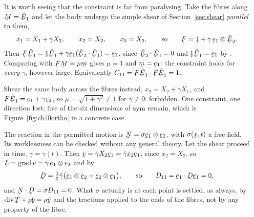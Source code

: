 \begin{example}
\label{ex:ch10fibre}
It is worth seeing that the constraint is far from paralysing. Take the
fibres along $\bM=\hbE_{1}$ and let the body undergo the simple shear of
Section~\ref{sec:shear} \emph{parallel} to them,
\[
   x_{1}=X_{1}+\gamma X_{2},\qquad x_{2}=X_{2},\qquad x_{3}=X_{3},
   \qquad\text{so}\qquad
   \bF=\shift+\gamma\,\be_{1}\otimes\hbE_{2}.
\]
Then $\bF\hbE_{1}=\shift\hbE_{1}+\gamma\be_{1}(\ip{\hbE_{2}}{\hbE_{1}})
=\be_{1}$, since $\ip{\hbE_{2}}{\hbE_{1}}=0$ and $\shift\hbE_{1}
=\be_{1}$ by . Comparing with $\bF\bM=\mu\bm$ gives $\mu=1$ and
$\bm=\be_{1}$: the constraint holds for \emph{every} $\gamma$, however
large. Equivalently $C_{11}=\ip{\bF\hbE_{1}}{\bF\hbE_{1}}=1$.

Shear the same body across the fibres instead, $x_{2}=X_{2}+\gamma
X_{1}$, and $\bF\hbE_{1}=\be_{1}+\gamma\be_{2}$, so
$\mu=\sqrt{1+\gamma^{2}}\neq1$ for $\gamma\neq0$: forbidden. One
constraint, one direction lost; five of the six dimensions of $\operatorname{sym}$
remain, which is Figure~\ref{fig:ch10ortho} in a concrete case.

The reaction in the permitted motion is $\bN=\sigma\be_{1}\otimes
\be_{1}$, with $\sigma(\bx,t)$ a free field. Its worklessness can be
checked without any general theory. Let the shear proceed in time,
$\gamma=\gamma(t)$. Then $\bv=\dot\gamma X_{2}\be_{1}
=\dot\gamma x_{2}\be_{1}$, since $x_{2}=X_{2}$, so
$\bL=\grad\bv=\dot\gamma\,\be_{1}\otimes\be_{2}$ and by 
\[
   \bD=\tfrac12\dot\gamma\big(\be_{1}\otimes\be_{2}
       +\be_{2}\otimes\be_{1}\big),
   \qquad\text{so}\qquad
   D_{11}=\ip{\be_{1}}{\bD\be_{1}}=0 ,
\]
and $\bN\cdot\bD=\sigma D_{11}=0$. What $\sigma$ actually is at each
point is settled, as always, by $\dvg\bT+\rho\bb=\rho\dot\bv$ and the
tractions applied to the ends of the fibres, not by any property of the
fibre.
\end{example}

